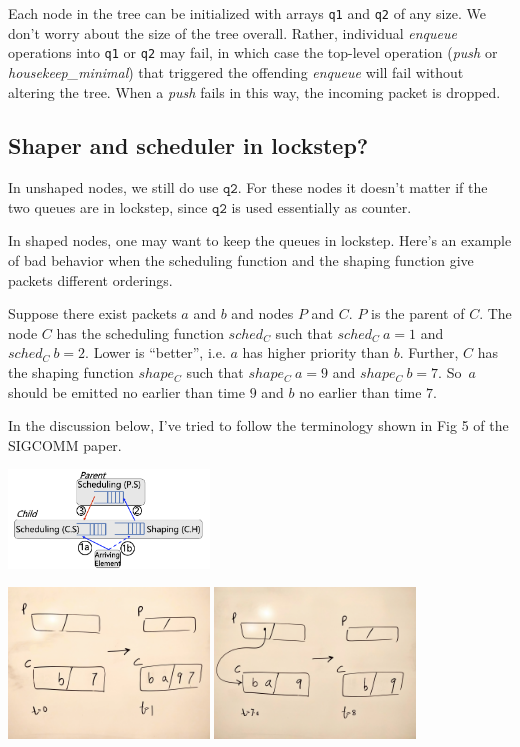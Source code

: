 \documentclass{article}
\begin{document}
Each node in the tree can be initialized with arrays \texttt{q1} and \texttt{q2} of any size. 
We don't worry about the size of the tree overall. 
Rather, individual \textit{enqueue} operations into \texttt{q1} or \texttt{q2} may fail, 
in which case the top-level operation (\textit{push} or \textit{housekeep\_minimal}) 
that triggered the offending \textit{enqueue} will fail
without altering the tree. When a \textit{push} fails in this way, the incoming packet is dropped.


\subsection{Shaper and scheduler in lockstep?}
 
In unshaped nodes, we still do use $\mathtt{q2}$. 
For these nodes it doesn't matter if the two queues are in lockstep, since 
$\mathtt{q2}$ is used essentially as counter.

In shaped nodes, one may want to keep the queues in lockstep. 
Here's an example of bad behavior when the scheduling function and 
the shaping function give packets different orderings.

Suppose there exist packets $a$ and $b$ and nodes $P$ and $C$.
$P$ is the parent of $C$.
The node $C$ has the scheduling function $\mathit{sched_{C}}$
such that
$\mathit{sched_{C}~a} = 1$ and $\mathit{sched_{C}~b} = 2$. 
Lower is ``better'', i.e. $a$ has higher priority than $b$.
Further, $C$ has the shaping function $\mathit{shape_{C}}$
such that $\mathit{shape_{C}~a}=9$ and $\mathit{shape_{C}~b}=7$.
So~$a$ should be emitted no earlier than time $9$ and $b$ no earlier than time $7$.

In the discussion below, I've tried to follow the terminology shown in Fig 5 of the
SIGCOMM paper.

\begin{center}
\includegraphics[width=0.4\textwidth]{siv_fig5}
\end{center}

\includegraphics[width=0.4\textwidth]{shaped_badly_1}
\includegraphics[width=0.4\textwidth]{shaped_badly_2}
\end{document}
